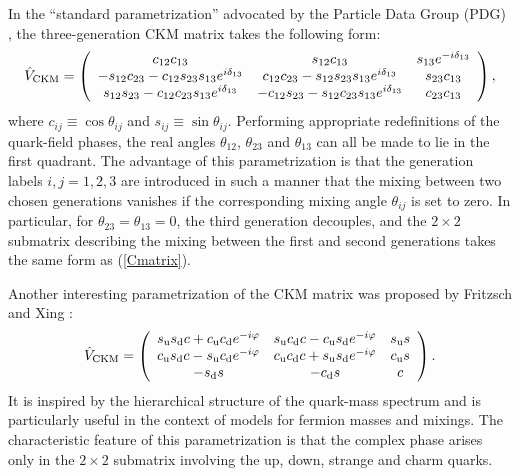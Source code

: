 \documentclass[11pt]{cernrep}
\begin{document}
In the ``standard parametrization'' advocated by the Particle Data Group
(PDG) \cite{PDG}, the three-generation CKM matrix takes the following 
form:
\begin{equation}\label{standard}
\hat V_{\rm CKM}=\left(\begin{array}{ccc}
c_{12}c_{13}&s_{12}c_{13}&s_{13}e^{-i\delta_{13}}\\ -s_{12}c_{23}
-c_{12}s_{23}s_{13}e^{i\delta_{13}}&c_{12}c_{23}-
s_{12}s_{23}s_{13}e^{i\delta_{13}}&
s_{23}c_{13}\\ s_{12}s_{23}-c_{12}c_{23}s_{13}e^{i\delta_{13}}&-c_{12}s_{23}
-s_{12}c_{23}s_{13}e^{i\delta_{13}}&c_{23}c_{13}
\end{array}\right),
\end{equation}
where $c_{ij}\equiv\cos\theta_{ij}$ and $s_{ij}\equiv\sin\theta_{ij}$. 
Performing appropriate redefinitions of the quark-field phases, the real 
angles $\theta_{12}$, $\theta_{23}$ and $\theta_{13}$ can all be made to
lie in the first quadrant. The advantage of this parametrization is that
the generation labels $i,j=1,2,3$ are introduced in such a manner that
the mixing between two chosen generations vanishes if the corresponding
mixing angle $\theta_{ij}$ is set to zero. In particular, for 
$\theta_{23}=\theta_{13}=0$, the third generation decouples, and the
$2\times2$ submatrix describing the mixing between the first and 
second generations takes the same form as (\ref{Cmatrix}).

Another interesting parametrization of the CKM matrix was proposed by 
Fritzsch and Xing \cite{FX}:
\begin{equation}
\hat V_{\rm CKM}=\left(\begin{array}{ccc}
s_{\rm u} s_{\rm d} c + c_{\rm u} c_{\rm d} e^{-i\varphi} & 
s_{\rm u} c_{\rm d} c - c_{\rm u} s_{\rm d} e^{-i\varphi} &s_{\rm u} s\\
c_{\rm u} s_{\rm d} c - s_{\rm u} c_{\rm d} e^{-i\varphi} & 
c_{\rm u} c_{\rm d} c + s_{\rm u} s_{\rm d} e^{-i\varphi} &c_{\rm u} s\\
-s_{\rm d}s & -c_{\rm d}s & c
\end{array}\right).
\end{equation}
It is inspired by the hierarchical structure of the quark-mass spectrum
and is particularly useful in the context of models for fermion masses and
mixings. The characteristic feature of this parametrization is that
the complex phase arises only in the $2\times2$ submatrix involving
the up, down, strange and charm quarks. 
\end{document}
